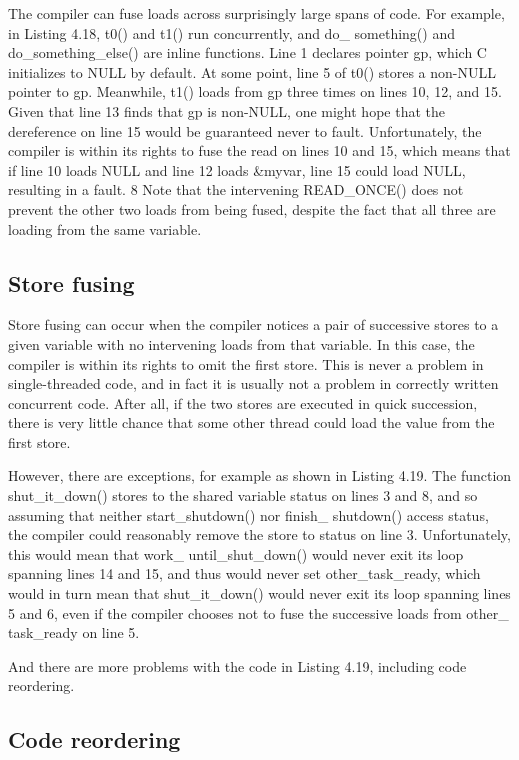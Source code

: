 The compiler can fuse loads across surprisingly large spans of code.
For example, in Listing 4.18, t0() and t1() run concurrently, and do\_
something() and do\_something\_else() are inline functions. Line 1
declares pointer gp, which C initializes to NULL by default. At some point,
line 5 of t0() stores a non-NULL pointer to gp. Meanwhile, t1() loads
from gp three times on lines 10, 12, and 15. Given that line 13 finds that
gp is non-NULL, one might hope that the dereference on line 15 would be
guaranteed never to fault. Unfortunately, the compiler is within its rights to
fuse the read on lines 10 and 15, which means that if line 10 loads NULL and
line 12 loads \&myvar, line 15 could load NULL, resulting in a fault. 8 Note
that the intervening READ\_ONCE() does not prevent the other two loads
from being fused, despite the fact that all three are loading from the same
variable.

\subsection{Store fusing}

Store fusing can occur when the compiler notices a pair of successive
stores to a given variable with no intervening loads from that variable. In
this case, the compiler is within its rights to omit the first store. This is never
a problem in single-threaded code, and in fact it is usually not a problem in
correctly written concurrent code. After all, if the two stores are executed
in quick succession, there is very little chance that some other thread could
load the value from the first store.

However, there are exceptions, for example as shown in Listing 4.19. The
function shut\_it\_down() stores to the shared variable status on lines 3
and 8, and so assuming that neither start\_shutdown() nor finish\_
shutdown() access status, the compiler could reasonably remove the
store to status on line 3. Unfortunately, this would mean that work\_
until\_shut\_down() would never exit its loop spanning lines 14 and 15,
and thus would never set other\_task\_ready, which would in turn mean
that shut\_it\_down() would never exit its loop spanning lines 5 and 6,
even if the compiler chooses not to fuse the successive loads from other\_
task\_ready on line 5.

And there are more problems with the code in Listing 4.19, including
code reordering.


\subsection{Code reordering}


